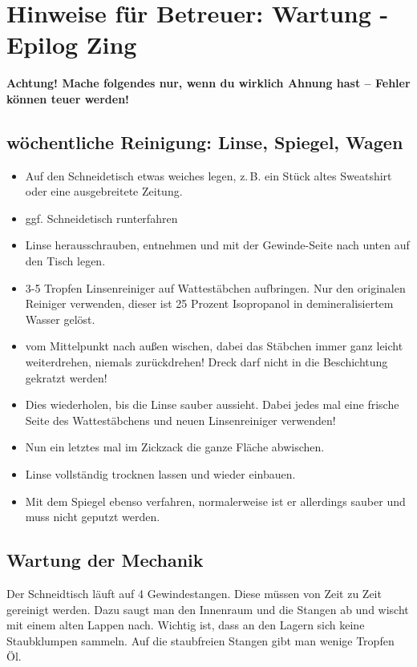 \documentclass{\basedir/fablab-document}
\begin{document}
	\newpage
	\section{Hinweise für Betreuer: Wartung - Epilog Zing}

	\textbf{Achtung! Mache folgendes nur, wenn du wirklich Ahnung hast -- Fehler können teuer werden!}

	\subsection{wöchentliche Reinigung: Linse, Spiegel, Wagen}
	\begin{itemize}
		\label{linsenreinigung}
		\item Auf den Schneidetisch etwas weiches legen, z.\,B. ein Stück altes Sweatshirt oder eine ausgebreitete Zeitung.
		\item ggf. Schneidetisch runterfahren
		\item Linse herausschrauben, entnehmen und mit der Gewinde-Seite nach unten auf den Tisch legen.
		\item 3-5 Tropfen Linsenreiniger auf Wattestäbchen aufbringen. Nur den originalen Reiniger verwenden, dieser ist 25 Prozent Isopropanol in demineralisiertem Wasser gelöst.
		\item vom Mittelpunkt nach außen wischen, dabei das Stäbchen immer ganz leicht weiterdrehen, niemals zurückdrehen! Dreck darf nicht in die Beschichtung gekratzt werden!
		\item Dies wiederholen, bis die Linse sauber aussieht. Dabei jedes mal eine frische Seite des Wattestäbchens und neuen Linsenreiniger verwenden!
		\item Nun ein letztes mal im Zickzack die ganze Fläche abwischen.
		\item Linse vollständig trocknen lassen und wieder einbauen.
		\item Mit dem Spiegel ebenso verfahren, normalerweise ist er allerdings sauber und muss nicht geputzt werden.
	\end{itemize}

	\subsection{Wartung der Mechanik}
	Der Schneidtisch läuft auf 4 Gewindestangen. Diese müssen von Zeit zu Zeit gereinigt werden. Dazu saugt man den Innenraum und die Stangen ab und wischt mit einem alten Lappen nach. Wichtig ist, dass an den Lagern sich keine Staubklumpen sammeln. Auf die staubfreien Stangen gibt man wenige Tropfen Öl.
\end{document}

